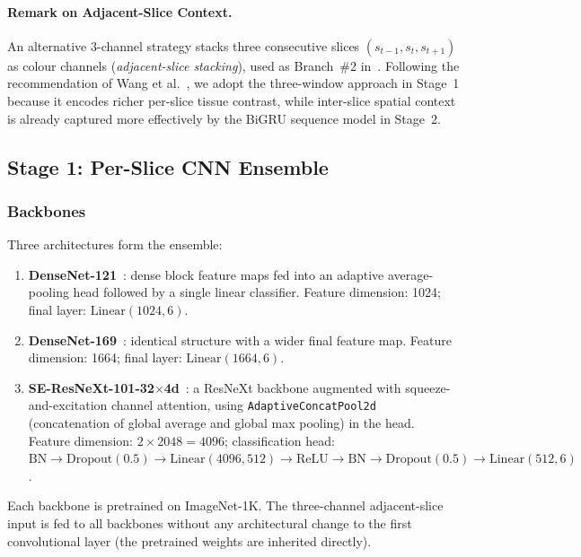 \paragraph{Remark on Adjacent-Slice Context.}
An alternative 3-channel strategy stacks three consecutive slices
$(s_{t-1}, s_t, s_{t+1})$ as colour channels (\emph{adjacent-slice
stacking}), used as Branch~\#2 in~\cite{sage2020doublebranch}.
Following the recommendation of Wang et al.~\cite{wang2021deeplearning},
we adopt the three-window approach in Stage~1 because it encodes richer
per-slice tissue contrast, while inter-slice spatial context is already
captured more effectively by the BiGRU sequence model in Stage~2.

\subsection{Stage 1: Per-Slice CNN Ensemble}
\label{sec:stage1}

\subsubsection{Backbones}

Three architectures form the ensemble:

\begin{enumerate}
    \item \textbf{DenseNet-121}~\cite{huang2017densely}: dense block
          feature maps fed into an adaptive average-pooling head followed
          by a single linear classifier.
          Feature dimension: 1024; final layer: $\mathrm{Linear}(1024, 6)$.
    \item \textbf{DenseNet-169}~\cite{huang2017densely}: identical structure
          with a wider final feature map.
          Feature dimension: 1664; final layer: $\mathrm{Linear}(1664, 6)$.
    \item \textbf{SE-ResNeXt-101-32$\times$4d}~\cite{hu2018squeeze}: a
          ResNeXt backbone augmented with squeeze-and-excitation channel
          attention, using \texttt{AdaptiveConcatPool2d} (concatenation of
          global average and global max pooling) in the head.
          Feature dimension: $2 \times 2048 = 4096$; classification head:
          $\mathrm{BN} \to \mathrm{Dropout}(0.5) \to \mathrm{Linear}(4096, 512)
          \to \mathrm{ReLU} \to \mathrm{BN} \to \mathrm{Dropout}(0.5) \to
          \mathrm{Linear}(512, 6)$.
\end{enumerate}

Each backbone is pretrained on ImageNet-1K.
The three-channel adjacent-slice input is fed to all backbones without
any architectural change to the first convolutional layer (the pretrained
weights are inherited directly).

